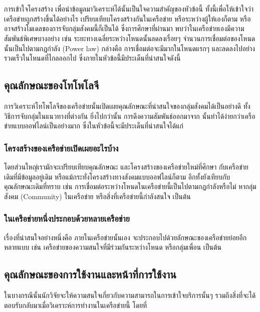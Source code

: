 \section{\STA}

การเข้าใจโครงสร้าง เพื่อนำข้อมูลมาวิเคราะห์ได้นั้นเป็นใจความสำคัญของหัวข้อนี้
ทั้งนี้เพื่อให้เข้าใจว่าเครือข่ายถูกสร้างขึ้นได้อย่างไร เปรียบเทียบโครงสร้างกันในเครือข่าย 
หรือระหว่างผู้ให้{\SNS}เองก็ตาม หรืออาจสร้างโมเดลของการจับกลุ่มสังคมนี้ก็เป็นได้
ซึ่งการศึกษาที่ผ่านมา พบว่าในเครือข่ายเองมีความสัมพันธ์พิเศษบางอย่าง เช่น 
ระยะทางเฉลี่ยระหว่างโหนดนั้นลดลงเรื่อยๆ 
จำนวนการเชื่อมต่อของโหนดนั้นเป็นไปตามกฎกำลัง (Power law) กล่างคือ
การเชื่อมต่อจะมีมากในโหนดแรกๆ และลดลงไปอย่างรวดเร็วในโหนดที่ไกลออกไป 
ซึ่งภายในหัวข้อนี้มีประเด็นที่น่าสนใจดังนี้

\subsection{คุณลักษณะของโทโพโลจี}
การวิเคราะห์โทโพโลจีของเครือข่ายนั้นเปิดเผยคุณลักษณะที่น่าสนใจของกลุ่มสังคมได้เป็นอย่างดี 
ทั้งวิธีการจับกลุ่มในแนวทางที่ต่างกัน ยิ่งไปกว่านั้น การดึงความสัมพันธ์ออกมาจาก{\OSN} 
นั้นทำได้ง่ายกว่าเครือข่ายแบบออฟไลน์เป็นอย่างมาก ซึ่งในหัวข้อนี้จะมีประเด็นที่น่าสนใจได้แก่

\subsubsection{โครงสร้างของเครือข่ายเปิดเผยอะไรบ้าง} โดยส่วนใหญ่เรามักจะเปรียบเทียบคุณลักษณะ
และโครงสร้างของเครือข่ายใหม่ที่ศึกษา กับเครือข่ายเดิมที่มีข้อมูลอยู่เดิม 
หรือแม้กระทั่งโครงสร้างทางสังคมแบบออฟไลน์ก็ตาม อีกทั้งยังเทียบกับคุณลักษณะเดิมที่ทราบ 
เช่น การเชื่อมต่อระหว่างโหนดในเครือข่ายนี้เป็นไปตามกฎกำลังหรือไม่ หากลุ่มสังคม (Community) ในเครือข่าย
หรือสิ่งที่เครือข่ายนี้กำลังสนใจ เป็นต้น

\subsubsection{ในเครือข่ายหนึ่งประกอบด้วยหลายเครือข่าย} เรื่องที่น่าสนใจอย่างหนึ่งคือ
ภายในเครือข่ายนั้นเอง จะประกอบไปด้วยลักษณะของเครือข่ายย่อยอีกหลายแบบ เช่น 
เครือข่ายของความสนใจที่มีร่วมกันระหว่างโหนด หรือกลุ่มเพื่อน เป็นต้น 

\subsection{คุณลักษณะของการใช้งานและหน้าที่การใช้งาน}
ในบางกรณีนั้นนักวิจัยจะให้ความสนใจเกี่ยวกับความสามารถในการเข้าใจบริการนั้นๆ 
รวมถึงสิ่งที่จะได้ตอบรับกลับมาเมื่อวิเคราะห์การทำงานในเครือข่ายนี้ โดยที่ 

